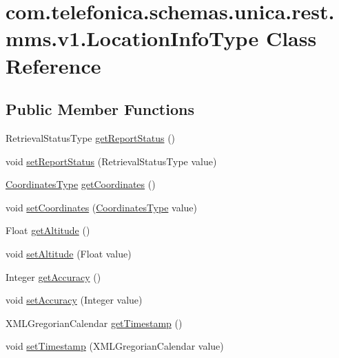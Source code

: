 \hypertarget{classcom_1_1telefonica_1_1schemas_1_1unica_1_1rest_1_1mms_1_1v1_1_1LocationInfoType}{
\section{com.telefonica.schemas.unica.rest.mms.v1.LocationInfoType Class Reference}
\label{classcom_1_1telefonica_1_1schemas_1_1unica_1_1rest_1_1mms_1_1v1_1_1LocationInfoType}
}
\subsection*{Public Member Functions}
\begin{DoxyCompactItemize}
\item 
RetrievalStatusType \hyperlink{classcom_1_1telefonica_1_1schemas_1_1unica_1_1rest_1_1mms_1_1v1_1_1LocationInfoType_a0720b95b63e5819ad02fc4236732621f}{getReportStatus} ()
\item 
void \hyperlink{classcom_1_1telefonica_1_1schemas_1_1unica_1_1rest_1_1mms_1_1v1_1_1LocationInfoType_a5e57ef7045ab6abe9b35a958583e0739}{setReportStatus} (RetrievalStatusType value)
\item 
\hyperlink{classcom_1_1telefonica_1_1schemas_1_1unica_1_1rest_1_1mms_1_1v1_1_1CoordinatesType}{CoordinatesType} \hyperlink{classcom_1_1telefonica_1_1schemas_1_1unica_1_1rest_1_1mms_1_1v1_1_1LocationInfoType_acb4e0f463edc5ebf8e002a7121444aed}{getCoordinates} ()
\item 
void \hyperlink{classcom_1_1telefonica_1_1schemas_1_1unica_1_1rest_1_1mms_1_1v1_1_1LocationInfoType_aec6919c1c3fa84f13ae4a76f088f5ecd}{setCoordinates} (\hyperlink{classcom_1_1telefonica_1_1schemas_1_1unica_1_1rest_1_1mms_1_1v1_1_1CoordinatesType}{CoordinatesType} value)
\item 
Float \hyperlink{classcom_1_1telefonica_1_1schemas_1_1unica_1_1rest_1_1mms_1_1v1_1_1LocationInfoType_ad02d3682ede95794a1202bd39e9cbcbd}{getAltitude} ()
\item 
void \hyperlink{classcom_1_1telefonica_1_1schemas_1_1unica_1_1rest_1_1mms_1_1v1_1_1LocationInfoType_ad6c86ee7868f1410ff261d2f73ca1490}{setAltitude} (Float value)
\item 
Integer \hyperlink{classcom_1_1telefonica_1_1schemas_1_1unica_1_1rest_1_1mms_1_1v1_1_1LocationInfoType_a2661862320da0b74390ce9fa7923b7d9}{getAccuracy} ()
\item 
void \hyperlink{classcom_1_1telefonica_1_1schemas_1_1unica_1_1rest_1_1mms_1_1v1_1_1LocationInfoType_aafdce358efd9dc187e93793b82edeee0}{setAccuracy} (Integer value)
\item 
XMLGregorianCalendar \hyperlink{classcom_1_1telefonica_1_1schemas_1_1unica_1_1rest_1_1mms_1_1v1_1_1LocationInfoType_aa08bd3014eda020ca3379d730bd62f51}{getTimestamp} ()
\item 
void \hyperlink{classcom_1_1telefonica_1_1schemas_1_1unica_1_1rest_1_1mms_1_1v1_1_1LocationInfoType_a8e29d06db1cecc5b157c46fa43e1602d}{setTimestamp} (XMLGregorianCalendar value)
\end{DoxyCompactItemize}
